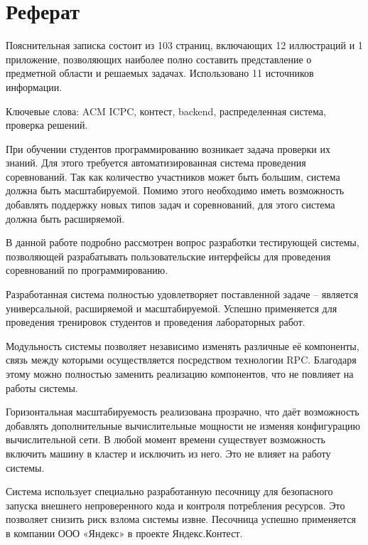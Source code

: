 \chapter*{Реферат}
Пояснительная записка состоит из
103 страниц, включающих 12 иллюстраций и 1 приложение,
позволяющих наиболее полно составить представление о предметной области и решаемых задачах.
Использовано 11 источников информации.

Ключевые слова: ACM ICPC, контест, backend, распределенная система, проверка решений.

При обучении студентов программированию возникает задача
проверки их знаний. Для этого требуется автоматизированная система
проведения соревнований. Так как количество участников
может быть большим, система должна быть масштабируемой.
Помимо этого необходимо иметь возможность добавлять поддержку
новых типов задач и соревнований, для этого
система должна быть расширяемой.


В данной работе подробно рассмотрен вопрос разработки тестирующей системы,
позволяющей разрабатывать пользовательские интерфейсы
для проведения соревнований по программированию.

Разработанная система полностью удовлетворяет поставленной задаче --
является универсальной, расширяемой и масштабируемой.
Успешно применяется для проведения тренировок студентов
и проведения лабораторных работ.

Модульность системы позволяет независимо изменять различные её компоненты,
связь между которыми осуществляется посредством технологии RPC.
Благодаря этому можно полностью заменить реализацию компонентов,
что не повлияет на работы системы.

Горизонтальная масштабируемость реализована прозрачно,
что даёт возможность добавлять дополнительные
вычислительные мощности не изменяя конфигурацию вычислительной сети.
В любой момент времени существует возможность включить машину в кластер
и исключить из него. Это не влияет на работу системы.

Система использует специально разработанную песочницу для
безопасного запуска внешнего непроверенного кода и контроля потребления ресурсов.
Это позволяет снизить риск взлома системы извне.
Песочница успешно применяется в компании ООО «Яндекс» в проекте Яндекс.Контест.
